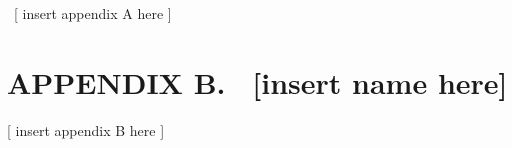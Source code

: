 \documentclass[twoside,letterpaper]{article}
\begin{document}
{\color{black}
\ [ insert appendix A here ]}

\clearpage\setcounter{page}{1}\pagestyle{Convertix}
\section[APPENDIX B. \ [insert name
here{]}]{\bfseries\color{black} APPENDIX B.
\ [insert name here]}

\bigskip

{\color{black}
[ insert appendix B here ]}


\bigskip
\end{document}
